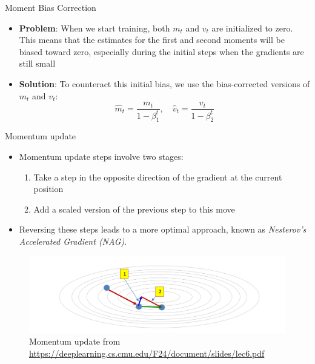 \documentclass[serif, aspectratio=169]{beamer}
\begin{document}
\begin{frame}{Moment Bias Correction}
    \begin{itemize}
        \item \textbf{Problem}: When we start training, both $m_t$ and $v_t$ are initialized to zero. This means that the estimates for the first and second moments will be biased toward zero, especially during the initial steps when the gradients are still small
        \item \textbf{Solution}: To counteract this initial bias, we use the bias-corrected versions of $m_t$ and $v_t$:
        \[\hat{m}_t = \frac{m_t}{1 - \beta_1^t}, \quad 
        \hat{v}_t = \frac{v_t}{1 -\beta_2^t}\]
    \end{itemize}
\end{frame}

\begin{frame}{Momentum update}
    \begin{minipage}{0.5\textwidth}
    \begin{itemize}
    \item Momentum update steps involve two stages:
    \begin{enumerate}
        \item Take a step in the opposite direction of the gradient at the current position
        \item Add a scaled version of the previous step to this move
    \end{enumerate}
    \item Reversing these steps leads to a more optimal approach, known as \textit{Nesterov's Accelerated Gradient (NAG)}.
    \end{itemize}
\end{minipage}%
\begin{minipage}{0.5\textwidth}
    \begin{figure}[h]
        \centering
        \includegraphics[height=.3\textheight]{pic/momentum_update.png}
        \caption{\footnotesize Momentum update from \url{https://deeplearning.cs.cmu.edu/F24/document/slides/lec6.pdf}}
    \end{figure}
\end{minipage}
\end{frame}
\end{document}
